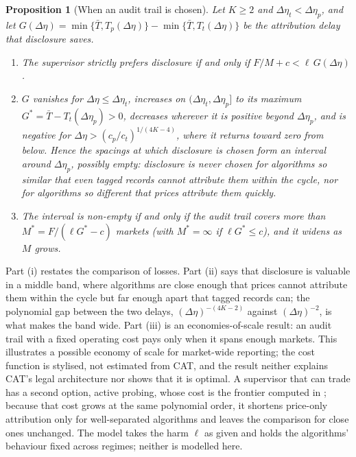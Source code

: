 \documentclass[12pt]{article}
\newtheorem{proposition}[theorem]{Proposition}
\theoremstyle{definition}
\theoremstyle{remark}
\begin{document}
\begin{proposition}[When an audit trail is chosen]\label{prop:choice}
Let $K\ge2$ and $\Delta\eta_t<\Delta\eta_p$, and let $G(\Delta\eta)=\min\{\bar T,T_p(\Delta\eta)\}-\min\{\bar T,T_t(\Delta\eta)\}$ be the attribution delay that disclosure saves.
\begin{enumerate}[label=(\roman*),itemsep=1pt]
\item The supervisor strictly prefers disclosure if and only if $F/M+c<\ell\,G(\Delta\eta)$.
\item $G$ vanishes for $\Delta\eta\le\Delta\eta_t$, increases on $(\Delta\eta_t,\Delta\eta_p]$ to its maximum $G^*=\bar T-T_t(\Delta\eta_p)>0$, decreases wherever it is positive beyond $\Delta\eta_p$, and is negative for $\Delta\eta>(c_p/c_t)^{1/(4K-4)}$, where it returns toward zero from below. Hence the spacings at which disclosure is chosen form an interval around $\Delta\eta_p$, possibly empty: disclosure is never chosen for algorithms so similar that even tagged records cannot attribute them within the cycle, nor for algorithms so different that prices attribute them quickly.
\item The interval is non-empty if and only if the audit trail covers more than $M^*=F/(\ell G^*-c)$ markets (with $M^*=\infty$ if $\ell G^*\le c$), and it widens as $M$ grows.
\end{enumerate}
\end{proposition}

Part (i) restates the comparison of losses. Part (ii) says that disclosure is valuable in a middle band, where algorithms are close enough that prices cannot attribute them within the cycle but far enough apart that tagged records can; the polynomial gap between the two delays, $(\Delta\eta)^{-(4K-2)}$ against $(\Delta\eta)^{-2}$, is what makes the band wide. Part (iii) is an economies-of-scale result: an audit trail with a fixed operating cost pays only when it spans enough markets. This illustrates a possible economy of scale for market-wide reporting; the cost function is stylised, not estimated from CAT, and the result neither explains CAT's legal architecture nor shows that it is optimal. A supervisor that can trade has a second option, active probing, whose cost is the frontier computed in \citet{niroula2026a}; because that cost grows at the same polynomial order, it shortens price-only attribution only for well-separated algorithms and leaves the comparison for close ones unchanged. The model takes the harm $\ell$ as given and holds the algorithms' behaviour fixed across regimes; neither is modelled here.
\end{document}
